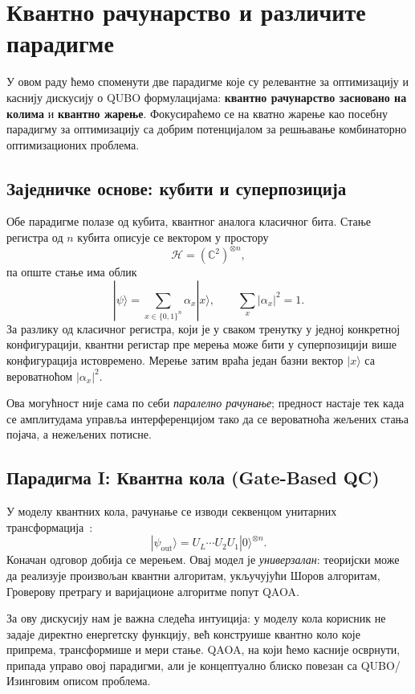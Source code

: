 \section{Квантно рачунарство и различите парадигме}
\label{sec:np}

У овом раду ћемо споменути две парадигме које су
релевантне за оптимизацију и каснију дискусију о QUBO формулацијама:
\textbf{квантно рачунарство засновано на колима} и
\textbf{квантно жарење}.
Фокусираћемо се на кватно жарење као посебну парадигму за оптимизацију
са добрим потенцијалом за решњавање комбинаторно оптимизационих проблема.
\subsection{Заједничке основе: кубити и суперпозиција}

Обе парадигме полазе од кубита, квантног аналога класичног бита.
Стање регистра од $n$ кубита описује се вектором у простору~\cite{wong2022}
\[
  \mathcal{H} = (\mathbb{C}^2)^{\otimes n},
\]
па опште стање има облик
\[
  |\psi\rangle = \sum_{x \in \{0,1\}^n} \alpha_x |x\rangle,
  \qquad \sum_x |\alpha_x|^2 = 1.
\]
За разлику од класичног регистра, који је у сваком тренутку у једној
конкретној конфигурацији, квантни регистар пре мерења може бити у
суперпозицији више конфигурација истовремено. Мерење затим враћа један
базни вектор $|x\rangle$ са вероватноћом $|\alpha_x|^2$.

Ова могућност није сама по себи \emph{паралелно рачунање}; предност настаје
тек када се амплитудама управља интерференцијом тако да се вероватноћа
жељених стања појача, а нежељених потисне.

\subsection{Парадигма I: Квантна кола (Gate-Based QC)}

У моделу квантних кола, рачунање се изводи секвенцом унитарних
трансформација~\cite{wong2022}:
\[
  |\psi_{\text{out}}\rangle = U_L \cdots U_2 U_1 |0\rangle^{\otimes n}.
\]
Коначан одговор добија се мерењем. Овај модел је \emph{универзалан}:
теоријски може да реализује произвољан квантни алгоритам, укључујући
Шоров алгоритам, Гроверову претрагу и варијационе алгоритме попут
QAOA.

За ову дискусију нам је важна следећа интуиција: у моделу кола корисник не задаје
директно енергетску функцију, већ конструише квантно коло које
припрема, трансформише и мери стање. QAOA, на који ћемо касније осврнути,
припада управо овој парадигми, али је концептуално блиско повезан са
QUBO/Изинговим описом проблема.

